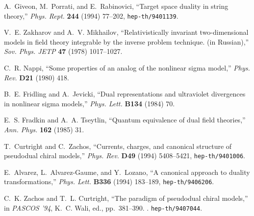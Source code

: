 \documentclass[a4paper,12pt]{article}
\begin{document}
\providecommand{\href}[2]{#2}\begingroup\raggedright\begin{thebibliography}{10}

A.~Giveon, M.~Porrati, and E.~Rabinovici, ``Target space duality in string
  theory,'' {\em Phys. Rept.} {\bf 244} (1994) 77--202,
\href{http://www.arXiv.org/abs/hep-th/9401139}{{\tt hep-th/9401139}}.

V.~E. Zakharov and A.~V. Mikhailov, ``Relativistically invariant
  two-dimensional models in field theory integrable by the inverse problem
  technique. (in {Russian}),'' {\em Sov. Phys. JETP} {\bf 47} (1978)
1017--1027.

C.~R. Nappi, ``Some properties of an analog of the nonlinear sigma model,''
  {\em Phys. Rev.} {\bf D21} (1980)
418.

B.~E. Fridling and A.~Jevicki, ``Dual representations and ultraviolet
  divergences in nonlinear sigma models,'' {\em Phys. Lett.} {\bf B134} (1984)
70.

E.~S. Fradkin and A.~A. Tseytlin, ``Quantum equivalence of dual field
  theories,'' {\em Ann. Phys.} {\bf 162} (1985)
31.

T.~Curtright and C.~Zachos, ``Currents, charges, and canonical structure of
  pseudodual chiral models,'' {\em Phys. Rev.} {\bf D49} (1994) 5408--5421,
\href{http://www.arXiv.org/abs/hep-th/9401006}{{\tt hep-th/9401006}}.

E.~Alvarez, L.~Alvarez-Gaume, and Y.~Lozano, ``A canonical approach to duality
  transformations,'' {\em Phys. Lett.} {\bf B336} (1994) 183--189,
\href{http://www.arXiv.org/abs/hep-th/9406206}{{\tt hep-th/9406206}}.

C.~K. Zachos and T.~L. Curtright, ``The paradigm of pseudodual chiral models,''
  in {\em {PASCOS} '94}, K.~C. Wali, ed., pp.~381--390.
.
\newblock
\href{http://www.arXiv.org/abs/hep-th/9407044}{{\tt hep-th/9407044}}.
\newblock


\end{thebibliography}
\end{document}
